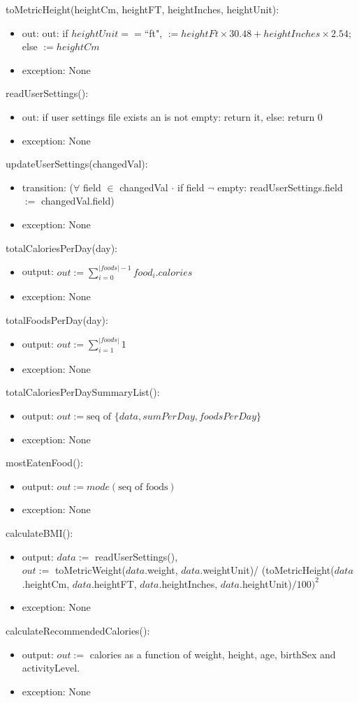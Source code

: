 \documentclass[12pt, titlepage]{article}
\begin{document}
\noindent toMetricHeight(heightCm, heightFT, heightInches, heightUnit):
\begin{itemize}
	\item out: out: if $heightUnit == $``ft", $:= heightFt \times 30.48 + 
	heightInches \times 2.54$; else $:= heightCm$
	\item exception: None
\end{itemize}
\noindent readUserSettings():
\begin{itemize}
	\item out: if user settings file exists an is not empty: return it, else: 
	return 0
	\item exception: None
\end{itemize}
\noindent updateUserSettings(changedVal):
\begin{itemize}
	\item transition: ($\forall$ field $\in$ changedVal $\cdot$ if field 
	$\lnot$ empty: readUserSettings.field $:=$ changedVal.field)
	\item exception: None
\end{itemize}
\noindent totalCaloriesPerDay(day):
\begin{itemize}
	\item output: $out := \sum_{i=0}^{|foods|-1}food_i.calories$ 
	\item exception: None
\end{itemize}
\noindent totalFoodsPerDay(day):
\begin{itemize}
	\item output: $out := \sum_{i=1}^{|foods|} 1$ 
	\item exception: None
\end{itemize}
\noindent totalCaloriesPerDaySummaryList():
\begin{itemize}
	\item output: $out := \text{seq of $\{data, sumPerDay, foodsPerDay\}$}$ 
	\item exception: None
\end{itemize}
\noindent mostEatenFood():
\begin{itemize}
	\item output: $out := mode(\text{seq of foods})$ 
	\item exception: None
\end{itemize}
\noindent calculateBMI():
\begin{itemize}
	\item output: $data :=$ readUserSettings(),\\
	$out:=$ toMetricWeight($data$.weight, $data.$weightUnit)/ 
	(toMetricHeight($data$.heightCm, $data$.heightFT, $data$.heightInches, 
	$data.$heightUnit)$/100)^2$
	\item exception: None
\end{itemize}
\noindent calculateRecommendedCalories():
\begin{itemize}
	\item output: $out :=$ calories as a function of weight, height, age, 
	birthSex and activityLevel.
	\item exception: None
\end{itemize}
\end{document}
